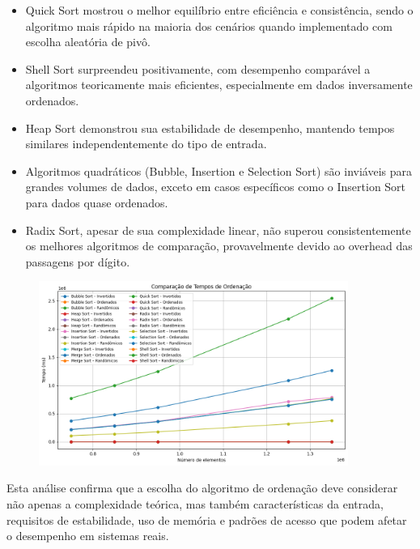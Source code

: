 \documentclass[a4paper, 12pt]{article}
\begin{document}
        \begin{itemize}
            \item Quick Sort mostrou o melhor equilíbrio entre eficiência e consistência, sendo o algoritmo mais rápido na maioria dos cenários quando implementado com escolha aleatória de pivô.
            \item Shell Sort surpreendeu positivamente, com desempenho comparável a algoritmos teoricamente mais eficientes, especialmente em dados inversamente ordenados.
            \item Heap Sort demonstrou sua estabilidade de desempenho, mantendo tempos similares independentemente do tipo de entrada.
            \item Algoritmos quadráticos (Bubble, Insertion e Selection Sort) são inviáveis para grandes volumes de dados, exceto em casos específicos como o Insertion Sort para dados quase ordenados.
                \item Radix Sort, apesar de sua complexidade linear, não superou consistentemente os melhores algoritmos de comparação, provavelmente devido ao overhead das passagens por dígito.
            \end{itemize}

            \begin{figure}[ht]
                \centering
                \includegraphics[width=0.9\textwidth]{images/tudoqueda.png}
            \end{figure}



            Esta análise confirma que a escolha do algoritmo de ordenação deve considerar não apenas a complexidade teórica, mas também características da entrada, requisitos de estabilidade, uso de memória e padrões de acesso que podem afetar o desempenho em sistemas reais.

\end{document}
